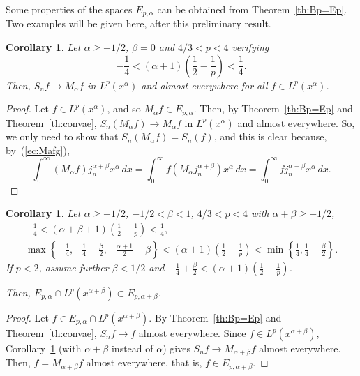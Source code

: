 \documentclass[reqno]{amsart}
\theoremstyle{plain}
\newtheorem{Cor}[Thm]{Corollary} %
\theoremstyle{definition}
\theoremstyle{remark}
\begin{document}
Some properties of the spaces $E_{p,\alpha}$ can be obtained from
Theorem~\ref{th:Bp=Ep}. Two examples will be given here, after this
preliminary result. 

\begin{Cor}
\label{cor:convMa}
Let $\alpha\ge-1/2$, $\beta=0$ and $4/3 < p < 4$ verifying
\begin{equation*}
   -\frac14 < (\alpha+1) \left( \frac12 - \frac1p \right) < \frac14.
\end{equation*}
Then, $S_nf \to M_\alpha f$ in $L^p(x^\alpha)$ and almost everywhere for all $f
\in L^p(x^\alpha)$.
\end{Cor}

\begin{proof}
Let $f \in L^p(x^\alpha)$, and so $M_\alpha f \in E_{p,\alpha}$.
Then, by Theorem~\ref{th:Bp=Ep} and Theorem~\ref{th:convae},
$S_n(M_\alpha f) \to M_\alpha f$ in $L^p(x^\alpha)$ and almost everywhere.
So, we only need to show that $S_n(M_\alpha f) = S_n(f)$, and
this is clear because, by~(\ref{ec:Mafg}),
\begin{equation*}
    \int_0^\infty (M_\alpha f) j_n^{\alpha+\beta} x^\alpha \,dx
    = \int_0^\infty f (M_\alpha j_n^{\alpha+\beta}) x^\alpha \,dx
    = \int_0^\infty f j_n^{\alpha+\beta} x^\alpha \,dx.
\end{equation*}
\end{proof}

\begin{Cor}
\label{cor:EpaEpa+b}
Let $\alpha\ge-1/2$, $-1/2 < \beta < 1$, $4/3 < p < 4$ with
$\alpha+\beta\ge-1/2$,
\begin{gather*}
    - \frac14 < (\alpha+\beta+1) \left(\frac12 - \frac1p \right) < \frac14,
   \\
   \max\left\{ -\frac14, -\frac14 - \frac\beta2, - \frac{\alpha+1}2 - \beta
       \right\}
   < (\alpha+1) \left(\frac12 - \frac1p \right) <
   \min\left\{ \frac14, \frac14 - \frac\beta2 \right\}.
\end{gather*}
If $p<2$, assume further $\beta<1/2$ and $-\frac14 + \frac\beta2 <
(\alpha+1) \left(\frac12 - \frac1p \right)$.

Then, $E_{p,\alpha} \cap L^p(x^{\alpha+\beta}) \subset E_{p,\alpha+\beta}$.
\end{Cor}

\begin{proof}
Let $f \in E_{p,\alpha} \cap L^p(x^{\alpha+\beta})$. By Theorem~\ref{th:Bp=Ep}
and Theorem~\ref{th:convae}, $S_n f \to f$ almost everywhere. Since $f \in
L^p(x^{\alpha+\beta})$, Corollary~\ref{cor:convMa} (with $\alpha +\beta$
instead of $\alpha$) gives $S_n f \to M_{\alpha+\beta}f$ almost everywhere.
Then, $f = M_{\alpha+\beta}f$ almost everywhere, that is,
$f \in E_{p,\alpha+\beta}$.
\end{proof}
\end{document}
